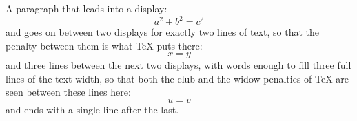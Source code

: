 \documentclass{article}
\begin{document}
A paragraph that leads into a display:
\[ a^2 + b^2 = c^2 \]
and goes on between two displays for exactly two lines of text, so that the penalty between them is what TeX puts there:
\[ x = y \]
and three lines between the next two displays, with words enough to fill three full lines of the text width, so that both the club and the widow penalties of TeX are seen between these lines here:
\[ u = v \]
and ends with a single line after the last.
\end{document}
